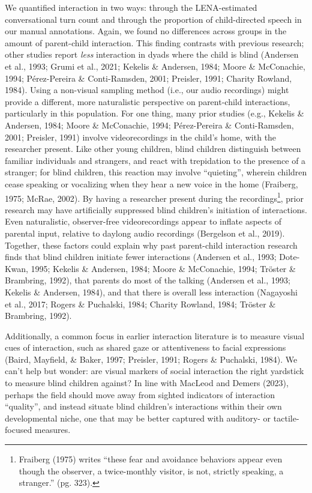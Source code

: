 \documentclass[
  man,floatsintext]{apa6}
\begin{document}
We quantified interaction in two ways: through the LENA-estimated conversational turn count and through the proportion of child-directed speech in our manual annotations. Again, we found no differences across groups in the amount of parent-child interaction. This finding contrasts with previous research; other studies report \emph{less} interaction in dyads where the child is blind (Andersen et al., 1993; Grumi et al., 2021; Kekelis \& Andersen, 1984; Moore \& McConachie, 1994; Pérez-Pereira \& Conti-Ramsden, 2001; Preisler, 1991; Charity Rowland, 1984). Using a non-visual sampling method (i.e., our audio recordings) might provide a different, more naturalistic perspective on parent-child interactions, particularly in this population. For one thing, many prior studies (e.g., Kekelis \& Andersen, 1984; Moore \& McConachie, 1994; Pérez-Pereira \& Conti-Ramsden, 2001; Preisler, 1991) involve videorecordings in the child's home, with the researcher present. Like other young children, blind children distinguish between familiar individuals and strangers, and react with trepidation to the presence of a stranger; for blind children, this reaction may involve ``quieting'', wherein children cease speaking or vocalizing when they hear a new voice in the home (Fraiberg, 1975; McRae, 2002). By having a researcher present during the recordings\footnote{Fraiberg (1975) writes ``these fear and avoidance behaviors appear even though the observer, a twice-monthly visitor, is not, strictly speaking, a stranger.'' (pg. 323).}, prior research may have artificially suppressed blind children's initiation of interactions. Even naturalistic, observer-free videorecordings appear to inflate aspects of parental input, relative to daylong audio recordings (Bergelson et al., 2019). Together, these factors could explain why past parent-child interaction research finds that blind children initiate fewer interactions (Andersen et al., 1993; Dote-Kwan, 1995; Kekelis \& Andersen, 1984; Moore \& McConachie, 1994; Tröster \& Brambring, 1992), that parents do most of the talking (Andersen et al., 1993; Kekelis \& Andersen, 1984), and that there is overall less interaction (Nagayoshi et al., 2017; Rogers \& Puchalski, 1984; Charity Rowland, 1984; Tröster \& Brambring, 1992).

Additionally, a common focus in earlier interaction literature is to measure visual cues of interaction, such as shared gaze or attentiveness to facial expressions (Baird, Mayfield, \& Baker, 1997; Preisler, 1991; Rogers \& Puchalski, 1984). We can't help but wonder: are visual markers of social interaction the right yardstick to measure blind children against? In line with MacLeod and Demers (2023), perhaps the field should move away from sighted indicators of interaction ``quality'', and instead situate blind children's interactions within their own developmental niche, one that may be better captured with auditory- or tactile-focused measures.
\end{document}
